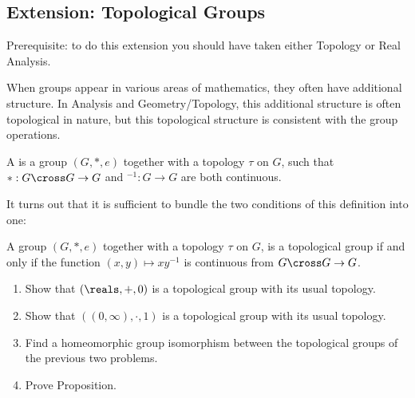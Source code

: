 
\subsection*{Extension: Topological Groups}

Prerequisite: to do this extension you should have taken either 
Topology or Real Analysis.

When groups appear in various areas of mathematics, they often have 
additional structure.  In Analysis and Geometry/Topology, this 
additional structure is often topological in nature, but this 
topological structure is consistent with the group operations.

\begin{definition}
  A  is a group $(G, 
  \ast, e)$ together with a topology $\tau$ on $G$, such that 
  $\ast: G \cross G \to G$ and ${}^{-1} : G \to G$ are both 
  continuous.
\end{definition}

It turns out that it is sufficient to bundle the two conditions of 
this definition into one:

\begin{proposition}
  A group $(G, \ast, e)$ together with a topology $\tau$ on $G$, is a 
  topological group if and only if the function $(x,y) \mapsto 
  xy^{-1}$ is continuous from $G \cross G \to G$.
\end{proposition}


\begin{enumerate}
    \item Show that $(\reals, +, 0)$ is a topological group with its 
    usual topology.

    \item Show that $((0,\infty), \cdot, 1)$ is a topological group with its 
    usual topology.
    
    \item Find a homeomorphic group isomorphism between the 
    topological groups of the previous two problems.
    
    \item Prove Proposition.
\end{enumerate}

